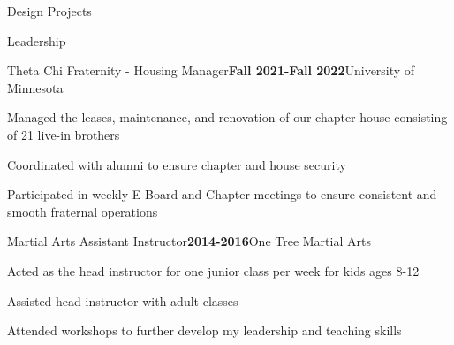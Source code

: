 \documentclass{resume} %
\begin{document}
\begin{rSection}{Design Projects}
	
	
\end{rSection}

\begin{rSection}{Leadership}
	
	\begin{rSubsection}{Theta Chi Fraternity - Housing Manager}{\bf Fall 2021-Fall 2022}{University of Minnesota}{}
		\item  Managed the leases, maintenance, and renovation of our chapter house consisting of 21 live-in brothers
		\item Coordinated with alumni to ensure chapter and house  security
		
		\item Participated in weekly E-Board and Chapter meetings to ensure consistent and smooth fraternal operations
	\end{rSubsection}
	
	\begin{rSubsection}{Martial Arts Assistant Instructor}{\bf 2014-2016}{One Tree Martial Arts}{}
		\item Acted as the head instructor for one junior class per week for kids ages 8-12
		
		\item Assisted head instructor with adult classes
		
		\item Attended workshops to further develop my leadership and teaching skills
	\end{rSubsection}
\end{rSection}
\end{document}
